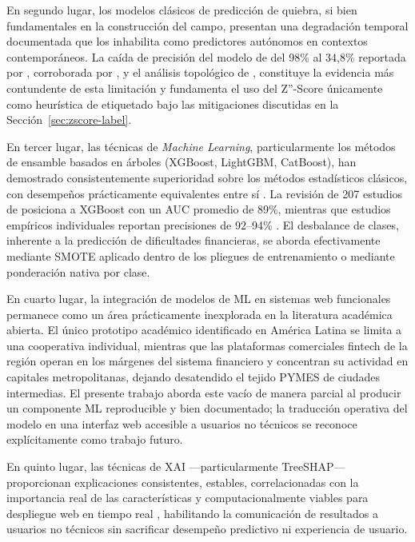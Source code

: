 \documentclass[12pt, letterpaper]{article}
\begin{document}
En segundo lugar, los modelos cl\'asicos de predicci\'on de quiebra, si bien fundamentales en la construcci\'on del campo, presentan una degradaci\'on temporal documentada que los inhabilita como predictores aut\'onomos en contextos contempor\'aneos. La ca\'ida de precisi\'on del modelo de \citet{Ohlson1980} del 98\% al 34,8\% reportada por \citet{Grice2003}, corroborada por \citet{Bouwmeester2020}, \citet{Papadouli2024} y el an\'alisis topol\'ogico de \citet{Qiu2020}, constituye la evidencia m\'as contundente de esta limitaci\'on y fundamenta el uso del Z''-Score \'unicamente como heur\'istica de etiquetado bajo las mitigaciones discutidas en la Secci\'on~\ref{sec:zscore-label}.

En tercer lugar, las t\'ecnicas de \textit{Machine Learning}, particularmente los m\'etodos de ensamble basados en \'arboles (XGBoost, LightGBM, CatBoost), han demostrado consistentemente superioridad sobre los m\'etodos estad\'isticos cl\'asicos, con desempe\~nos pr\'acticamente equivalentes entre s\'i \citep{Sujatha2025}. La revisi\'on de 207 estudios de \citet{Dasilas2024} posiciona a XGBoost con un AUC promedio de 89\%, mientras que estudios emp\'iricos individuales reportan precisiones de 92--94\% \citep{Boumhidi2025, Yufenyuy2024, Mahesh2025}. El desbalance de clases, inherente a la predicci\'on de dificultades financieras, se aborda efectivamente mediante SMOTE aplicado dentro de los pliegues de entrenamiento \citep{Sun2020, Kristanti2025} o mediante ponderaci\'on nativa por clase.

En cuarto lugar, la integraci\'on de modelos de ML en sistemas web funcionales permanece como un \'area pr\'acticamente inexplorada en la literatura acad\'emica abierta. El \'unico prototipo acad\'emico identificado en Am\'erica Latina \citep{MayorgaLira2023} se limita a una cooperativa individual, mientras que las plataformas comerciales fintech de la regi\'on \citep{Ioannou2022} operan en los m\'argenes del sistema financiero y concentran su actividad en capitales metropolitanas, dejando desatendido el tejido PYMES de ciudades intermedias. El presente trabajo aborda este vac\'io de manera parcial al producir un componente ML reproducible y bien documentado; la traducci\'on operativa del modelo en una interfaz web accesible a usuarios no t\'ecnicos se reconoce expl\'icitamente como trabajo futuro.

En quinto lugar, las t\'ecnicas de XAI ---particularmente TreeSHAP--- proporcionan explicaciones consistentes, estables, correlacionadas con la importancia real de las caracter\'isticas \citep{Pathi2025, Lin2024, Bussmann2020} y computacionalmente viables para despliegue web en tiempo real \citep{LundbergTreeSHAP2020, Deng2024}, habilitando la comunicaci\'on de resultados a usuarios no t\'ecnicos sin sacrificar desempe\~no predictivo ni experiencia de usuario.
\end{document}
